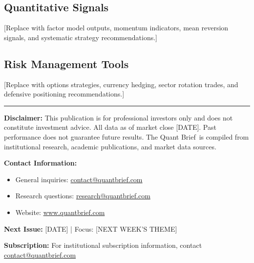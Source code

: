 \documentclass[11pt,a4paper]{article}
\makeatletter
\newcommand{\companyname}{The Quant Brief}
\newcommand{\companyemail}{contact@quantbrief.com}
\newcommand{\researchemail}{research@quantbrief.com}
\newcommand{\companywebsite}{www.quantbrief.com}
\makeatother
\begin{document}
\subsection{Quantitative Signals}

[Replace with factor model outputs, momentum indicators, mean reversion signals, and systematic strategy recommendations.]

\subsection{Risk Management Tools}

[Replace with options strategies, currency hedging, sector rotation trades, and defensive positioning recommendations.]

\vspace{1cm}

\begin{center}
\color{mediumgray}
\rule{0.6\textwidth}{0.6pt}
\end{center}

\vspace{0.5cm}

{\footnotesize
\textbf{Disclaimer:} This publication is for professional investors only and does not constitute investment advice. All data as of market close [DATE]. Past performance does not guarantee future results. \companyname~is compiled from institutional research, academic publications, and market data sources.

\textbf{Contact Information:}
\begin{itemize}[leftmargin=*, noitemsep]
    \item General inquiries: \href{mailto:\companyemail}{\companyemail}
    \item Research questions: \href{mailto:\researchemail}{\researchemail}
    \item Website: \href{https://\companywebsite}{\companywebsite}
\end{itemize}

\textbf{Next Issue:} [DATE] | Focus: [NEXT WEEK'S THEME]

\textbf{Subscription:} For institutional subscription information, contact \href{mailto:\companyemail}{\companyemail}
}
\end{document}
